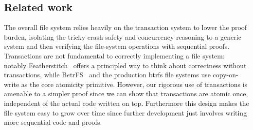 \subsection{Related work}

The overall file system relies heavily on the transaction system to
lower the proof burden, isolating the tricky crash safety and concurrency
reasoning to a generic system and then verifying the file-system operations with
sequential proofs. Transactions are not fundamental to correctly implementing a
file system: notably Featherstitch~\cite{frost:featherstitch} offers a
principled way to think about correctness without transactions, while
B$e$trFS~\cite{jannen:betrfs} and the production btrfs file systems use
copy-on-write as the core atomicity primitive. However, our rigorous use of
transactions is amenable to a simpler proof since we can show that transactions
are atomic once, independent of the actual code written on top. Furthermore this
design makes the file system easy to grow over time since further development
just involves writing more sequential code and proofs.
